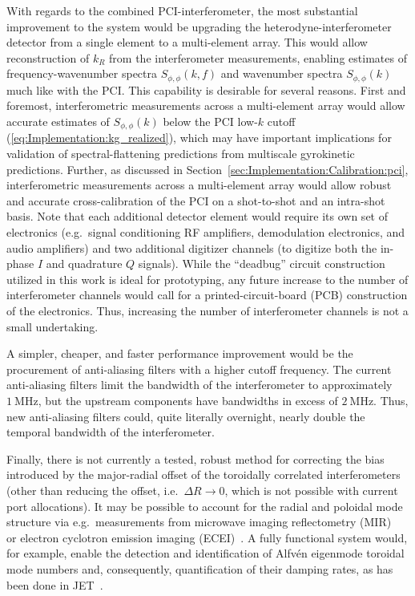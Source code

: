 With regards to the combined PCI-interferometer,
the most substantial improvement to the system
would be upgrading the heterodyne-interferometer detector
from a single element to a multi-element array.
This would allow reconstruction of $k_R$
from the interferometer measurements,
enabling estimates of
frequency-wavenumber spectra $S_{\phi,\phi}(k,f)$ and
wavenumber spectra $S_{\phi,\phi}(k)$
much like with the PCI.
This capability is desirable for several reasons.
First and foremost,
interferometric measurements across a multi-element array
would allow accurate estimates of $S_{\phi,\phi}(k)$
below the PCI low-$k$ cutoff
(\ref{eq:Implementation:kg_realized}), which
may have important implications for
validation of spectral-flattening predictions
from multiscale gyrokinetic predictions.
Further, as discussed in
Section~\ref{sec:Implementation:Calibration:pci},
interferometric measurements across a multi-element array
would allow robust and accurate
cross-calibration of the PCI
on a shot-to-shot and an intra-shot basis.
Note that each additional detector element
would require its own set of electronics
(e.g.\ signal conditioning RF amplifiers,
demodulation electronics, and
audio amplifiers) and
two additional digitizer channels
(to digitize both the in-phase $I$ and quadrature $Q$ signals).
While the ``deadbug'' circuit construction utilized in this work
is ideal for prototyping,
any future increase to the number of interferometer channels
would call for a printed-circuit-board (PCB) construction
of the electronics.
Thus, increasing the number of interferometer channels
is not a small undertaking.

A simpler, cheaper, and faster performance improvement
would be the procurement of anti-aliasing filters
with a higher cutoff frequency.
The current anti-aliasing filters
limit the bandwidth of the interferometer to
approximately $\SI{1}{\mega\hertz}$, but
the upstream components have bandwidths
in excess of $\SI{2}{\mega\hertz}$.
Thus, new anti-aliasing filters could,
quite literally overnight,
nearly double the temporal bandwidth of the interferometer.

Finally, there is not currently a tested, robust method
for correcting the bias introduced by
the major-radial offset of the toroidally correlated interferometers
(other than reducing the offset, i.e.\ $\Delta R \rightarrow 0$,
which is not possible with current port allocations).
It may be possible to account for the radial and poloidal mode structure
via e.g.\ measurements from
microwave imaging reflectometry (MIR)~\cite{muscatello_rsi14} or
electron cyclotron emission imaging (ECEI)~\cite{tobias_rsi10}.
A fully functional system would, for example,
enable the detection and identification
of Alfv\'{e}n eigenmode toroidal mode numbers and,
consequently, quantification of their damping rates,
as has been done in JET~\cite{aslanyan_eps17}.

